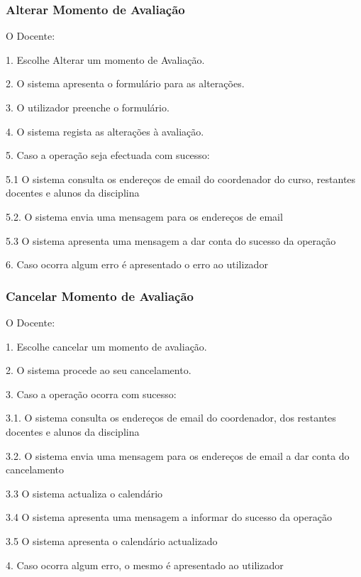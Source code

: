 \subsubsection{Alterar Momento de Avaliação}

O Docente:

1. Escolhe Alterar um momento de Avaliação.

2. O sistema apresenta o formulário para as alterações.

3. O utilizador preenche o formulário.

4. O sistema regista as alterações à avaliação.

5. Caso a operação seja efectuada com sucesso:

5.1 O sistema consulta os endereços de email do coordenador do curso, restantes docentes e alunos da disciplina

5.2. O sistema envia uma mensagem para os endereços de email

5.3 O sistema apresenta uma mensagem a dar conta do sucesso da operação

6. Caso ocorra algum erro é apresentado o erro ao utilizador

\subsubsection{Cancelar Momento de Avaliação}

O Docente:

1. Escolhe cancelar um momento de avaliação.

2. O sistema procede ao seu cancelamento.

3. Caso a operação ocorra com sucesso:

3.1. O sistema consulta os endereços de email do coordenador, dos restantes docentes e alunos da disciplina

3.2. O sistema envia uma mensagem para os endereços de email a dar conta do cancelamento

3.3 O sistema actualiza o calendário

3.4 O sistema apresenta uma mensagem a informar do sucesso da operação

3.5 O sistema apresenta o calendário actualizado

4. Caso ocorra algum erro, o mesmo é apresentado ao utilizador
